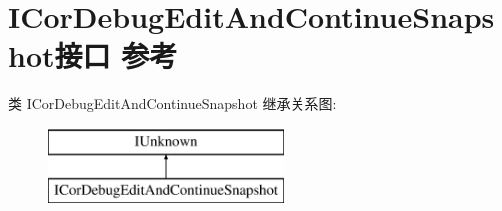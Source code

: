 \hypertarget{interface_i_cor_debug_edit_and_continue_snapshot}{}\section{I\+Cor\+Debug\+Edit\+And\+Continue\+Snapshot接口 参考}
\label{interface_i_cor_debug_edit_and_continue_snapshot}
类 I\+Cor\+Debug\+Edit\+And\+Continue\+Snapshot 继承关系图\+:\begin{figure}[H]
\begin{center}
\leavevmode
\includegraphics[height=2.000000cm]{interface_i_cor_debug_edit_and_continue_snapshot}
\end{center}
\end{figure}
